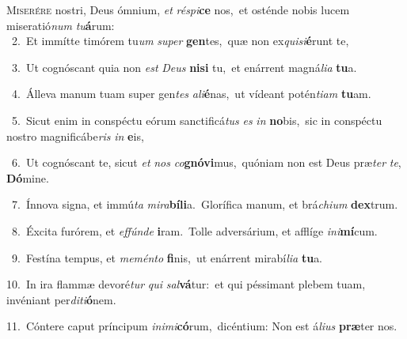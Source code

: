 \lettrine{\initial\textcolor{\initialcolor}{M}}{iserére} nostri, Deus ómnium, \textit{et} \textit{ré}\-\textit{spi}\textbf{ce} nos,~\star et osténde nobis lucem miseratió\textit{num} \textit{tu}\-\textbf{á}rum:\\
{\numbfont\textcolor{\numbcolor}{~2.}}~Et immítte timórem tu\textit{um} \textit{su}\-\textit{per} \textbf{gen}\-tes,~\star quæ non ex\-\textit{qui}\-\textit{si}\textbf{é}runt te,\par
{\numbfont\textcolor{\numbcolor}{~3.}}~Ut cognóscant quia non \textit{est} \textit{De}\-\textit{us} \textbf{ni}\-\textbf{si} tu,~\star et enárrent magná\-\textit{li}\-\textit{a} \textbf{tu}\-a.\par
{\numbfont\textcolor{\numbcolor}{~4.}}~Álleva manum tuam super gen\textit{tes} \textit{a}\-\textit{li}\textbf{é}nas,~\star ut vídeant potén\-\textit{ti}\-\textit{am} \textbf{tu}\-am.\par
{\numbfont\textcolor{\numbcolor}{~5.}}~Sicut enim in conspéctu eórum sanctificá\textit{tus} \textit{es} \textit{in} \textbf{no}\-bis,~\star sic in conspéctu nostro magnificábe\textit{ris} \textit{in} \textbf{e}\-is,\par
{\numbfont\textcolor{\numbcolor}{~6.}}~Ut cognóscant te, sicut \textit{et} \textit{nos} \textit{co}\-\textbf{gnó}\textbf{vi}mus,~\star quóniam non est Deus præ\textit{ter} \textit{te}\-, \textbf{Dó}\-mine.\par
{\numbfont\textcolor{\numbcolor}{~7.}}~Ínnova signa, et immú\textit{ta} \textit{mi}\-\textit{ra}\textbf{bí}\textbf{li}a.~\star Glorífica manum, et brá\-\textit{chi}\-\textit{um} \textbf{dex}\-trum.\par
{\numbfont\textcolor{\numbcolor}{~8.}}~Éxcita furórem, et \textit{ef}\-\textit{fún}\textit{de} \textbf{i}\-ram.~\star Tolle adversárium, et afflíge \textit{in}\-\textit{i}\textbf{mí}cum.\par
{\numbfont\textcolor{\numbcolor}{~9.}}~Festína tempus, et \textit{me}\-\textit{mén}\textit{to} \textbf{fi}\-nis,~\star ut enárrent mirabí\-\textit{li}\-\textit{a} \textbf{tu}\-a.\par
{\numbfont\textcolor{\numbcolor}{10.}}~In ira flammæ devoré\textit{tur} \textit{qui} \textit{sal}\-\textbf{vá}tur:~\star et qui péssimant plebem tuam, invéniant per\-\textit{di}\-\textit{ti}\textbf{ó}nem.\par
{\numbfont\textcolor{\numbcolor}{11.}}~Cóntere caput príncipum \textit{in}\-\textit{i}\textit{mi}\textbf{có}rum,~\star dicéntium: Non est á\-\textit{li}\-\textit{us} \textbf{præ}\-ter nos.\par
